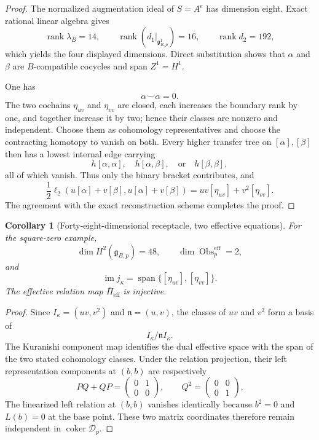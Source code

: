 \documentclass[11pt]{amsart}
\newtheorem{corollary}[theorem]{Corollary}
\newcommand{\Span}{\operatorname{span}}
\newcommand{\coker}{\operatorname{coker}}
\newcommand{\rank}{\operatorname{rank}}
\newcommand{\Obs}{\operatorname{Obs}}
\newcommand{\cD}{\mathscr D}
\newcommand{\ghoch}{\mathfrak g}
\begin{document}
\begin{proof}
The normalized augmentation ideal of $S=A^e$ has dimension eight.  Exact rational linear algebra gives
\[
\rank\lambda_B=14,
\qquad
\rank(d_1|_{\ghoch^1_{B,p}})=16,
\qquad
\rank d_2=192,
\]
which yields the four displayed dimensions.  Direct substitution shows that $\alpha$ and $\beta$ are $B$-compatible cocycles and span $Z^1=H^1$.

One has
\[
\alpha\smile\alpha=0.
\]
The two cochains $\eta_{uv}$ and $\eta_{vv}$ are closed, each increases the boundary rank by one, and together increase it by two; hence their classes are nonzero and independent.  Choose them as cohomology representatives and choose the contracting homotopy to vanish on both.  Every higher transfer tree on $[\alpha],[\beta]$ then has a lowest internal edge carrying
\[
h[\alpha,\alpha],
\quad
h[\alpha,\beta],
\quad\text{or}\quad
h[\beta,\beta],
\]
all of which vanish.  Thus only the binary bracket contributes, and
\[
\frac12\ell_2(u[\alpha]+v[\beta],u[\alpha]+v[\beta])
=
uv[\eta_{uv}]+v^2[\eta_{vv}].
\]
The agreement with the exact reconstruction scheme completes the proof.
\end{proof}

\begin{corollary}[Forty-eight-dimensional receptacle, two effective equations]\label{cor:two-parameter-effective}
For the square-zero example,
\[
\dim H^2(\ghoch_{B,p})=48,
\qquad
\dim\Obs^{\mathrm{eff}}_p=2,
\]
and
\[
\operatorname{im}j_\kappa
=
\Span\{[\eta_{uv}],[\eta_{vv}]\}.
\]
The effective relation map $\overline\Pi_{\mathrm{eff}}$ is injective.
\end{corollary}

\begin{proof}
Since $I_\kappa=(uv,v^2)$ and $\mathfrak n=(u,v)$, the classes of $uv$ and $v^2$ form a basis of
\[
I_\kappa/\mathfrak nI_\kappa.
\]
The Kuranishi component map identifies the dual effective space with the span of the two stated cohomology classes.  Under the relation projection, their left representation components at $(b,b)$ are respectively
\[
PQ+QP=
\begin{pmatrix}0&1\\0&0\end{pmatrix},
\qquad
Q^2=
\begin{pmatrix}0&0\\0&1\end{pmatrix}.
\]
The linearized left relation at $(b,b)$ vanishes identically because $b^2=0$ and $L(b)=0$ at the base point.  These two matrix coordinates therefore remain independent in $\coker\cD_p$.
\end{proof}
\end{document}
